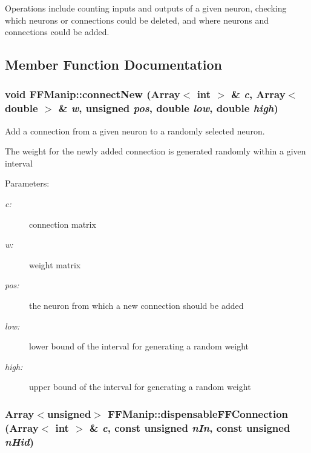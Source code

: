 Operations include counting inputs and outputs of a given neuron, checking which neurons or connections could be deleted, and where neurons and connections could be added. 



\subsection{Member Function Documentation}
\subsubsection{\setlength{\rightskip}{0pt plus 5cm}void FFManip::connect\-New (Array$<$ int $>$ \& {\em c}, Array$<$ double $>$ \& {\em w}, unsigned {\em pos}, double {\em low}, double {\em high})\hspace{0.3cm}{\tt  [protected]}}\label{classFFManip_b4}


Add a connection from a given neuron to a randomly selected neuron.

The weight for the newly added connection is generated randomly within a given interval \begin{Desc}
\item[Parameters: ]\par
\begin{description}
\item[{\em 
c:}]connection matrix \item[{\em 
w:}]weight matrix \item[{\em 
pos:}]the neuron from which a new connection should be added \item[{\em 
low:}]lower bound of the interval for generating a random weight \item[{\em 
high:}]upper bound of the interval for generating a random weight \end{description}
\end{Desc}
\subsubsection{\setlength{\rightskip}{0pt plus 5cm}Array$<$unsigned$>$ FFManip::dispensable\-FFConnection (Array$<$ int $>$ \& {\em c}, const unsigned {\em n\-In}, const unsigned {\em n\-Hid})\hspace{0.3cm}{\tt  [protected]}}\label{classFFManip_b10}


